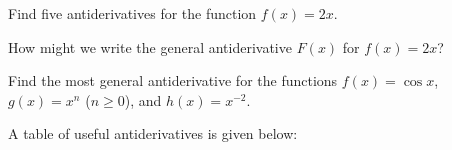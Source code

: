 \documentclass[notes]{subfiles}
\begin{document}
		\begin{ex}
			Find five antiderivatives for the function $f(x) = 2x$.
		\end{ex}
			
		\begin{question}
			How might we write the general antiderivative $F(x)$ for $f(x) = 2x$?  
		\end{question}
			
		\begin{ex}
			Find the most general antiderivative for the functions $f(x) = \cos x$, $g(x) = x^n$ ($n\geq 0$), and $h(x) = x^{-2}$.
		\end{ex}
			\newpage
			
		A table of useful antiderivatives is given below:
			
\end{document}
